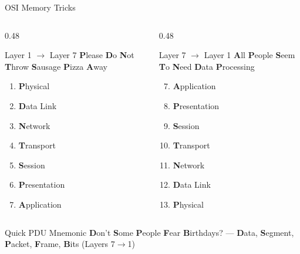 \documentclass[aspectratio=169]{beamer}  %
\begin{document}
\begin{frame}{OSI Memory Tricks}
    \begin{columns}[T]
        \begin{column}{0.48\textwidth}
            \begin{block}{Layer 1 $\rightarrow$ Layer 7}
                \textbf{P}lease \textbf{D}o \textbf{N}ot \textbf{T}hrow \textbf{S}ausage \textbf{P}izza \textbf{A}way
                \vspace{0.3em}
                \begin{enumerate}
                    \item \textbf{P}hysical
                    \item \textbf{D}ata Link
                    \item \textbf{N}etwork
                    \item \textbf{T}ransport
                    \item \textbf{S}ession
                    \item \textbf{P}resentation
                    \item \textbf{A}pplication
                \end{enumerate}
            \end{block}
        \end{column}
        \begin{column}{0.48\textwidth}
            \begin{block}{Layer 7 $\rightarrow$ Layer 1}
                \textbf{A}ll \textbf{P}eople \textbf{S}eem \textbf{T}o \textbf{N}eed \textbf{D}ata \textbf{P}rocessing
                \vspace{0.3em}
                \begin{enumerate}
                    \setcounter{enumi}{6}
                    \item[7.] \textbf{A}pplication
                    \item[6.] \textbf{P}resentation
                    \item[5.] \textbf{S}ession
                    \item[4.] \textbf{T}ransport
                    \item[3.] \textbf{N}etwork
                    \item[2.] \textbf{D}ata Link
                    \item[1.] \textbf{P}hysical
                \end{enumerate}
            \end{block}
        \end{column}
    \end{columns}
    
    \vspace{0.5em}
    \begin{exampleblock}{Quick PDU Mnemonic}
        \textbf{D}on't \textbf{S}ome \textbf{P}eople \textbf{F}ear \textbf{B}irthdays? --- \textbf{D}ata, \textbf{S}egment, \textbf{P}acket, \textbf{F}rame, \textbf{B}its (Layers 7$\rightarrow$1)
    \end{exampleblock}
\end{frame}
\end{document}
